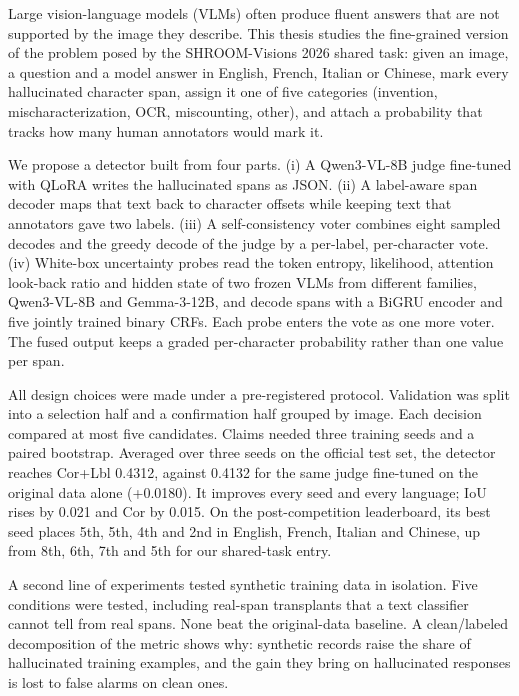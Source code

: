 Large vision-language models (VLMs) often produce fluent answers that are not supported by the image they describe. This thesis studies the fine-grained version of the problem posed by the SHROOM-Visions 2026 shared task: given an image, a question and a model answer in English, French, Italian or Chinese, mark every hallucinated character span, assign it one of five categories (invention, mischaracterization, OCR, miscounting, other), and attach a probability that tracks how many human annotators would mark it.

We propose a detector built from four parts. (i) A Qwen3-VL-8B judge fine-tuned with QLoRA writes the hallucinated spans as JSON. (ii) A label-aware span decoder maps that text back to character offsets while keeping text that annotators gave two labels. (iii) A self-consistency voter combines eight sampled decodes and the greedy decode of the judge by a per-label, per-character vote. (iv) White-box uncertainty probes read the token entropy, likelihood, attention look-back ratio and hidden state of two frozen VLMs from different families, Qwen3-VL-8B and Gemma-3-12B, and decode spans with a BiGRU encoder and five jointly trained binary CRFs. Each probe enters the vote as one more voter. The fused output keeps a graded per-character probability rather than one value per span.

All design choices were made under a pre-registered protocol. Validation was split into a selection half and a confirmation half grouped by image. Each decision compared at most five candidates. Claims needed three training seeds and a paired bootstrap. Averaged over three seeds on the official test set, the detector reaches Cor+Lbl 0.4312, against 0.4132 for the same judge fine-tuned on the original data alone (+0.0180). It improves every seed and every language; IoU rises by 0.021 and Cor by 0.015. On the post-competition leaderboard, its best seed places 5th, 5th, 4th and 2nd in English, French, Italian and Chinese, up from 8th, 6th, 7th and 5th for our shared-task entry.

A second line of experiments tested synthetic training data in isolation. Five conditions were tested, including real-span transplants that a text classifier cannot tell from real spans. None beat the original-data baseline. A clean/labeled decomposition of the metric shows why: synthetic records raise the share of hallucinated training examples, and the gain they bring on hallucinated responses is lost to false alarms on clean ones.
